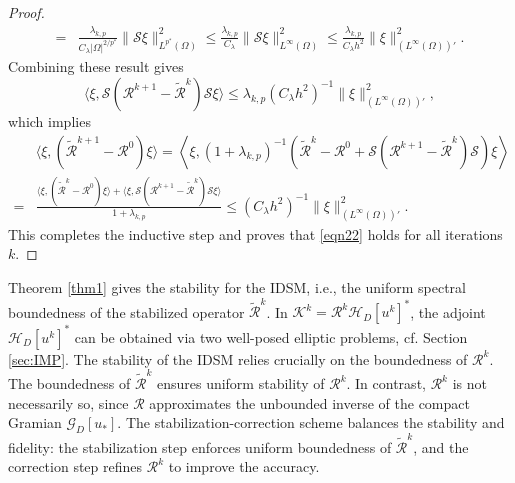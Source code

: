 \documentclass[onefignum,onetabnum]{siamart190516}
\numberwithin{equation}{section}
\begin{document}
\begin{proof}
\begin{align*}
=& \frac{\lambda_{k,p}}{C_{\lambda}|\Omega|^{2/p^{*}}}\|\mathcal{S}\xi\|_{L^{p^{*}}(\Omega)}^{2} \leq \frac{\lambda_{k,p}}{C_{\lambda}}\|\mathcal{S}\xi\|_{L^{\infty}(\Omega)}^{2} \leq\frac{\lambda_{k,p}}{C_{\lambda}h^{2}}\|\xi\|_{(L^{\infty}(\Omega))'}^{2}.
\end{align*}
Combining these result gives 
$$\langle \xi, \mathcal{S}(\mathcal{R}^{k+1} - \widetilde{\mathcal{R}}^{k})\mathcal{S}\xi \rangle \leq \lambda_{k,p}\left(C_{\lambda}h^{2}\right)^{-1}\|\xi\|_{(L^{\infty}(\Omega))'}^{2},$$ 
which implies
\begin{equation*}
\begin{aligned}
&\langle \xi, (\widetilde{\mathcal{R}}^{k+1}-\mathcal{R}^{0})\xi \rangle = \left\langle \xi,(1 + \lambda_{k,p})^{-1}\left(\widetilde{\mathcal{R}}^{k}-\mathcal{R}^{0}+\mathcal{S}\left(\mathcal{R}^{k+1}-\widetilde{\mathcal{R}}^{k}\right)\mathcal{S}\right) \xi \right\rangle\\
=& \frac{\langle \xi, (\widetilde{\mathcal{R}}^{k}-\mathcal{R}^{0} ) \xi \rangle+\langle \xi, \mathcal{S}(\mathcal{R}^{k+1}- \widetilde{\mathcal{R}}^{k})\mathcal{S} \xi \rangle}{1 + \lambda_{k,p}}
\leq \left(C_{\lambda}h^{2}\right)^{-1}\|\xi\|_{(L^{\infty}(\Omega))'}^{2}.
\end{aligned}
\end{equation*}
This completes the inductive step and proves that \eqref{eqn22} holds for all iterations $k$.
\end{proof}

Theorem \ref{thm1} gives the stability for the IDSM, i.e., the {uniform} spectral boundedness of the stabilized operator $\widetilde{\mathcal{R}}^{k}$.
In $\mathcal{K}^k = \mathcal{R}^k \mathcal{H}_D[u^k]^*$, the adjoint $\mathcal{H}_D[u^k]^*$ can be obtained via two well-posed elliptic problems, cf.  Section \ref{sec:IMP}.
The stability of the IDSM relies crucially on the boundedness of $\mathcal{R}^k$.
The boundedness of $\widetilde{\mathcal{R}}^k$ ensures uniform stability of $\mathcal{R}^{k}$.
In contrast, $\mathcal{R}^k$ is not necessarily so, since  $\mathcal{R}$ approximates the unbounded inverse of the compact Gramian $\mathcal{G}_D[u_*]$.
The stabilization-correction scheme balances the stability and fidelity: the stabilization step enforces uniform boundedness of $\widetilde{\mathcal{R}}^k$, and the correction step refines $\mathcal{R}^k$ to improve the accuracy.
\end{document}
